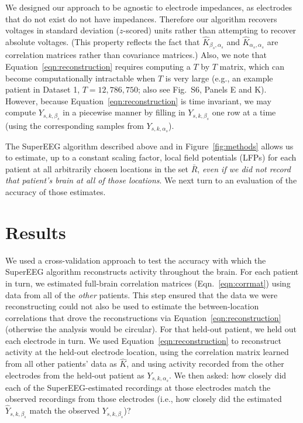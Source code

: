 \documentclass[11pt]{article}
\newcommand{\suppstats}{S6}
\begin{document}
We designed our approach to be agnostic to electrode impedances, as electrodes
that do not exist do not have impedances.  Therefore our algorithm recovers
voltages in standard deviation ($z$-scored) units rather than attempting to
recover absolute voltages. (This property reflects the fact that
$\hat{K}_{\beta_s, \alpha_s}$ and $\hat{K}_{\alpha_s, \alpha_s}$ are correlation
matrices rather than covariance matrices.)  Also, we note that
Equation~\ref{eqn:reconstruction} requires computing a $T$ by $T$ matrix, which
can become computationally intractable when $T$ is very large (e.g., an example
patient in Dataset 1, $T = 12,786,750$; also see Fig.~\suppstats, Panels E and
K). However, because Equation~\ref{eqn:reconstruction} is time invariant, we may
compute $Y_{s,k,\beta_s}$ in a piecewise manner by filling in $Y_{s,k,\beta_s}$
one row at a time (using the corresponding samples from $Y_{s, k, \alpha_s}$).

The SuperEEG algorithm described above and in Figure~\ref{fig:methods} allows us
to estimate, up to a constant scaling factor, local field potentials (LFPs) for
each patient at all arbitrarily chosen locations in the set $\bar{R}$,
\textit{even if we did not record that patient's brain at all of those
locations}.  We next turn to an evaluation of the accuracy of those estimates.

\section*{Results}
We used a cross-validation approach to test the accuracy with
which the SuperEEG algorithm reconstructs activity throughout the brain. For
each patient in turn, we estimated full-brain correlation matrices
(Eqn.~\ref{eqn:corrmat}) using data from all of the \textit{other} patients.
This step ensured that the data we were reconstructing could not also be used to
estimate the between-location correlations that drove the reconstructions via
Equation~\ref{eqn:reconstruction} (otherwise the analysis would be circular).
For that held-out patient, we held out each electrode in turn.  We used
Equation~\ref{eqn:reconstruction} to reconstruct activity at the held-out
electrode location, using the correlation matrix learned from all other
patients' data as $\hat{K}$, and using activity recorded from the other
electrodes from the held-out patient as $Y_{s, k, \alpha_s}$.  We then asked:
how closely did each of the SuperEEG-estimated recordings at those electrodes
match the observed recordings from those electrodes (i.e., how closely did the
estimated $\hat{Y}_{s, k, \beta_s}$ match the observed $Y_{s, k, \beta_s}$)?
\end{document}
